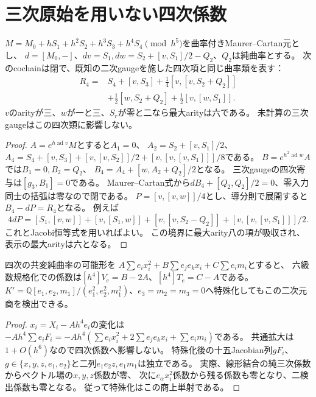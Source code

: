 \section{三次原始を用いない四次係数}
\begin{lemma}[有限BCHの縮小代表]\label{mix:bchfour}
$M=M_0+hS_1+h^2S_2+h^3S_3+h^4S_4\pmod{h^5}$を曲率付きMaurer--Cartan元とし、
$d=[M_0,-]$、$dv=S_1,dw=S_2+[v,S_1]/2-Q_2$、$Q_2$は純曲率とする。
次のcochainは閉で、既知の二次gaugeを施した四次項と同じ曲率類を表す：
\begin{align*}
 R_4={}&S_4+[v,S_3]+\tfrac14[v,[v,S_2+Q_2]]\\
       &+\tfrac12[w,S_2+Q_2]+\tfrac12[v,[w,S_1]].
\end{align*}
$v$のarityが三、$w$が一と三、$S_r$が零と二なら最大arityは六である。
未計算の三次gaugeはこの四次類に影響しない。
\end{lemma}
\begin{proof}
$A=e^{h\operatorname{ad}v}M$とすると$A_1=0$、
$A_2=S_2+[v,S_1]/2$、
$A_4=S_4+[v,S_3]+[v,[v,S_2]]/2+[v,[v,[v,S_1]]]/8$である。
$B=e^{h^2\operatorname{ad}w}A$では$B_1=0,B_2=Q_2$、
$B_4=A_4+[w,A_2+Q_2]/2$となる。
三次gaugeの四次寄与は$[g_3,B_1]=0$である。
Maurer--Cartan式から$dB_4+[Q_2,Q_2]/2=0$、零入力同士の括弧は零なので閉である。
$P=[v,[v,w]]/4$とし、導分則で展開すると$B_4-dP=R_4$となる。
例えば
\[
 4dP=[S_1,[v,w]]+[v,[S_1,w]]+[v,[v,S_2-Q_2]]
       +[v,[v,[v,S_1]]]/2.
\]
これとJacobi恒等式を用いればよい。
この境界に最大arity八の項が吸収され、表示の最大arityは六となる。
\end{proof}

\begin{proposition}[二係数を読むJacobian商]\label{mix:fourquot}
四次の共変純曲率の可能形を
$A\sum e_ix_i^2+B\sum e_je_kx_i+C\sum e_im_i$とすると、
六級数規格化での係数は$[h^4]V_e=B-2A$、$[h^4]T_e=C-A$である。
$K'=\mathbb Q[e_1,e_2,m_1]/(e_1^2,e_2^2,m_1^2)$、$e_3=m_2=m_3=0$へ特殊化してもこの二次元商を検出できる。
\end{proposition}
\begin{proof}
$x_i=X_i-Ah^4e_i$の変化は
$-Ah^4\sum e_iF_i=-Ah^4(\sum e_ix_i^2+2\sum e_je_kx_i+\sum e_im_i)$である。
共通拡大は$1+O(h^6)$なので四次係数へ影響しない。
特殊化後の十五Jacobian列$gF_i$、$g\in\{x,y,z,e_1,e_2\}$と二列$e_1e_2z,e_1m_1$は独立である。
実際、線形結合の純三次係数からベクトル場の$x,y,z$係数が零、
次に$e_\alpha x_i^2$係数から残る係数も零となり、二検出係数も零となる。
従って特殊化はこの商上単射である。
\end{proof}

